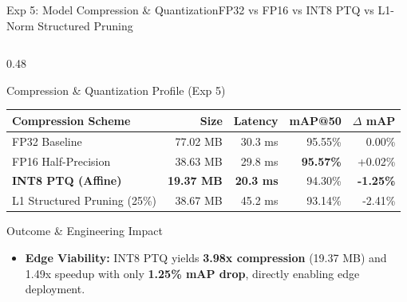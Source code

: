 \begin{frame}{Exp 5: Model Compression \& Quantization}{FP32 vs FP16 vs INT8 PTQ vs L1-Norm Structured Pruning}
\begin{columns}[c]
\begin{column}{0.48\textwidth}
            \vspace{0.06cm}
            \begin{card}{Compression \& Quantization Profile (Exp 5)}
                \centering
                \tiny
                \renewcommand{\arraystretch}{1.08}
                \setlength{\tabcolsep}{2.2pt}
                \begin{tabular}{l r r r r}
                    \toprule
                    \textbf{Compression Scheme} & \textbf{Size} & \textbf{Latency} & \textbf{mAP@50} & \textbf{$\Delta$ mAP} \\
                    \midrule
                    FP32 Baseline & 77.02 MB & 30.3 ms & 95.55\% & 0.00\% \\
                    FP16 Half-Precision & 38.63 MB & 29.8 ms & \textbf{95.57\%} & +0.02\% \\
                    \textbf{INT8 PTQ (Affine)} & \textbf{19.37 MB} & \textbf{20.3 ms} & 94.30\% & \textbf{-1.25\%} \\
                    L1 Structured Pruning (25\%) & 38.67 MB & 45.2 ms & 93.14\% & -2.41\% \\
                    \bottomrule
                \end{tabular}
            \end{card}
            
            \vspace{0.04cm}
            \begin{alertblockcustom}{Outcome \& Engineering Impact}
                \scriptsize
                \begin{itemize}\setlength{\itemsep}{1.2pt}
                    \item \textbf{Edge Viability:} INT8 PTQ yields \textbf{3.98x compression} (19.37 MB) and 1.49x speedup with only \textbf{1.25\% mAP drop}, directly enabling edge deployment.
                \end{itemize}
            \end{alertblockcustom}
        \end{column}
    \end{columns}
\end{frame}

